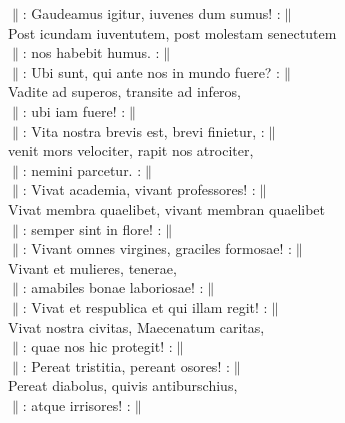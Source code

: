 \documentclass[a6paper, 10pt, twoside]{article}
\begin{document}
\noindent
\begin{center}
\end{center}
\begin{lyrics}
$\|$: Gaudeamus igitur, iuvenes dum sumus! :$\|$\\
Post icundam iuventutem, post molestam senectutem\\
$\|$: nos habebit humus. :$\|$
\vspace{5pt}\\
$\|$: Ubi sunt, qui ante nos in mundo fuere? :$\|$\\
Vadite ad superos, transite ad inferos,\\
$\|$: ubi iam fuere! :$\|$
\vspace{5pt}\\
$\|$: Vita nostra brevis est, brevi finietur, :$\|$\\
venit mors velociter, rapit nos atrociter,\\
$\|$: nemini parcetur. :$\|$
\vspace{5pt}\\
$\|$: Vivat academia, vivant professores! :$\|$\\
Vivat membra quaelibet, vivant membran quaelibet\\
$\|$: semper sint in flore! :$\|$
\vspace{5pt}\\
$\|$: Vivant omnes virgines, graciles formosae! :$\|$\\
Vivant et mulieres, tenerae,\\
$\|$: amabiles bonae laboriosae! :$\|$
\vspace{5pt}\\
$\|$: Vivat et respublica et qui illam regit! :$\|$\\
Vivat nostra civitas, Maecenatum caritas,\\
$\|$: quae nos hic protegit! :$\|$
\vspace{5pt}\\
$\|$: Pereat tristitia, pereant osores! :$\|$\\
Pereat diabolus, quivis antiburschius,\\
$\|$: atque irrisores! :$\|$ 
\end{lyrics}
\end{document}
